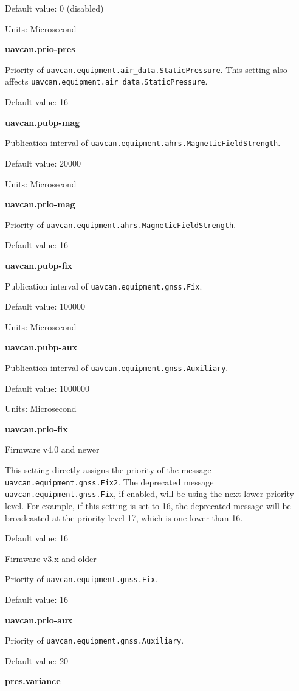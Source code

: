 \documentclass{zubaxdoc}
\begin{document}
Default value: 0 (disabled)

Units: Microsecond

\textbf{uavcan.prio-pres}

Priority of \texttt{uavcan.equipment.air{\_}data.StaticPressure}. This setting also affects \texttt{uavcan.equipment.air{\_}data.StaticPressure}.

Default value: 16
 
\textbf{uavcan.pubp-mag}

Publication interval of \texttt{uavcan.equipment.ahrs.MagneticFieldStrength}.

Default value: 20000

Units: Microsecond

\textbf{uavcan.prio-mag}

Priority of \texttt{uavcan.equipment.ahrs.MagneticFieldStrength}.

Default value: 16

\textbf{uavcan.pubp-fix}

Publication interval of \texttt{uavcan.equipment.gnss.Fix}.

Default value: 100000

Units: Microsecond

\textbf{uavcan.pubp-aux}

Publication interval of \texttt{uavcan.equipment.gnss.Auxiliary}.

Default value: 1000000

Units: Microsecond

\textbf{uavcan.prio-fix}

Firmware v4.0 and newer

This setting directly assigns the priority of the message \texttt{uavcan.equipment.gnss.Fix2}. The deprecated message  \texttt{uavcan.equipment.gnss.Fix}, if enabled, will be using the next lower priority level. For example, if this setting is set to 16, the deprecated message will be broadcasted at the priority level 17, which is one lower than 16.

Default value: 16

Firmware v3.x and older

Priority of \texttt{uavcan.equipment.gnss.Fix}.

Default value: 16

\textbf{uavcan.prio-aux}

Priority of \texttt{uavcan.equipment.gnss.Auxiliary}.

Default value: 20

\textbf{pres.variance}
\end{document}
